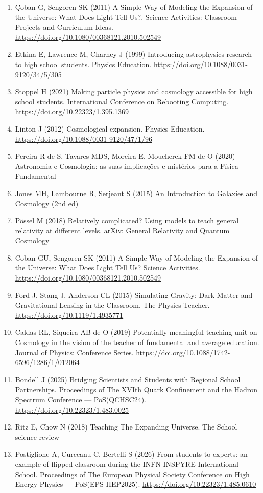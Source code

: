 {\begin{enumerate}
\item Çoban G, Sengoren SK (2011) A Simple Way of Modeling the Expansion of the Universe: What Does Light Tell Us?. Science Activities: Classroom Projects and Curriculum Ideas. \url{https://doi.org/10.1080/00368121.2010.502549}
\item Etkina E, Lawrence M, Charney J (1999) Introducing astrophysics research to high school students. Physics Education. \url{https://doi.org/10.1088/0031-9120/34/5/305}
\item Stoppel H (2021) Making particle physics and cosmology accessible for high school students. International Conference on Rebooting Computing. \url{https://doi.org/10.22323/1.395.1369}
\item Linton J (2012) Cosmological expansion. Physics Education. \url{https://doi.org/10.1088/0031-9120/47/1/96}
\item Pereira R de S, Tavares MDS, Moreira E, Moucherek FM de O (2020) Astronomia e Cosmologia: as suas implicações e mistérios para a Física Fundamental
\item Jones MH, Lambourne R, Serjeant S (2015) An Introduction to Galaxies and Cosmology (2nd ed)
\item Pössel M (2018) Relatively complicated? Using models to teach general relativity at different levels. arXiv: General Relativity and Quantum Cosmology
\item Coban GU, Sengoren SK (2011) A Simple Way of Modeling the Expansion of the Universe: What Does Light Tell Us? Science Activities. \url{https://doi.org/10.1080/00368121.2010.502549}
\item Ford J, Stang J, Anderson CL (2015) Simulating Gravity: Dark Matter and Gravitational Lensing in the Classroom. The Physics Teacher. \url{https://doi.org/10.1119/1.4935771}
\item Caldas RL, Siqueira AB de O (2019) Potentially meaningful teaching unit on Cosmology in the vision of the teacher of fundamental and average education. Journal of Physics: Conference Series. \url{https://doi.org/10.1088/1742-6596/1286/1/012064}
\item Bondell J (2025) Bridging Scientists and Students with Regional School Partnerships. Proceedings of The XVIth Quark Confinement and the Hadron Spectrum Conference — PoS(QCHSC24). \url{https://doi.org/10.22323/1.483.0025}
\item Ritz E, Chow N (2018) Teaching The Expanding Universe. The School science review
\item Postiglione A, Curceanu C, Bertelli S (2026) From students to experts: an example of flipped classroom during the INFN-INSPYRE International School. Proceedings of The European Physical Society Conference on High Energy Physics — PoS(EPS-HEP2025). \url{https://doi.org/10.22323/1.485.0610}

\end{enumerate}}
